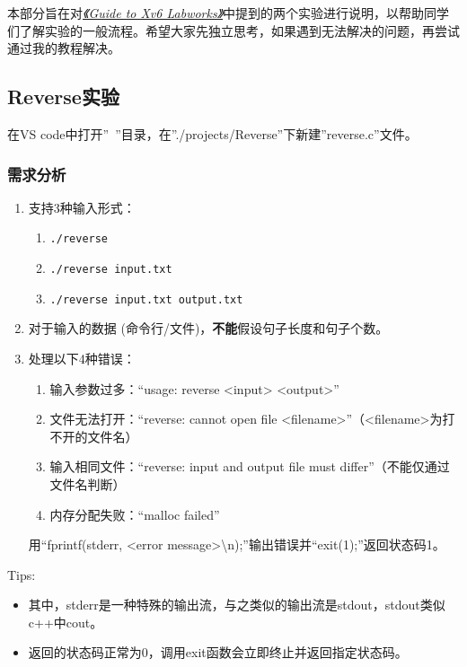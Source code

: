 \documentclass[fontset=ubuntu]{ctexart}
\let\oldhref\href{}
\renewcommand{\href}[2]{\oldhref{#1}{\textit{#2}}}
\begin{document}
本部分旨在对\href{https://www.overleaf.com/read/bfhkrzwmhrrs}{《Guide to Xv6 Labworks》}中提到的两个实验进行说明，以帮助同学们了解实验的一般流程。希望大家先独立思考，如果遇到无法解决的问题，再尝试通过我的教程解决。

\subsection{Reverse实验}

在VS code中打开”~”目录，在”./projects/Reverse”下新建”reverse.c”文件。

\subsubsection{需求分析}

\begin{enumerate}
    \item 支持3种输入形式：
          \begin{enumerate}
              \item \texttt{./reverse}
              \item \texttt{./reverse input.txt}
              \item \texttt{./reverse input.txt output.txt}
          \end{enumerate}
    \item 对于输入的数据 (命令行/文件)，\textbf{不能}假设句子长度和句子个数。
    \item 处理以下4种错误：
          \begin{enumerate}
              \item 输入参数过多：“usage: reverse <input> <output>”
              \item 文件无法打开：“reverse: cannot open file <filename>”（<filename>为打不开的文件名）
              \item 输入相同文件：“reverse: input and output file must differ”（不能仅通过文件名判断）
              \item 内存分配失败：“malloc failed”
          \end{enumerate}
          用“fprintf(stderr, <error message>\textbackslash{}n);”输出错误并“exit(1);”返回状态码1。%
\end{enumerate}

\noindent Tips:
\vspace{-0.5cm}
\begin{itemize}
    \item 其中，stderr是一种特殊的输出流，与之类似的输出流是stdout，stdout类似c++中cout。
    \item 返回的状态码正常为0，调用exit函数会立即终止并返回指定状态码。
\end{itemize}
\end{document}
